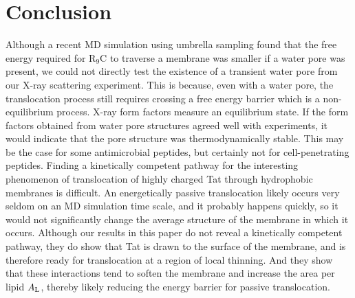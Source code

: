 \section{Conclusion}\label{sec:conclusion}
Although a recent MD simulation using umbrella sampling \cite{Huang13} found 
that the free energy required for R$_9$C to traverse a membrane was smaller 
if a water pore was present, we could not directly test the existence of a 
transient water pore from our X-ray scattering experiment. 
This is because, even with a water pore, the translocation process still 
requires crossing a free energy barrier which is a non-equilibrium process. 
X-ray form factors measure an equilibrium state. If the form factors obtained 
from water pore structures agreed well with experiments, it would indicate 
that the pore structure was thermodynamically stable. This may be the case for 
some antimicrobial peptides, but certainly not for cell-penetrating peptides.
Finding a kinetically competent pathway for the interesting phenomenon of 
translocation of highly charged Tat through hydrophobic membranes is difficult. 
An energetically passive translocation likely occurs very seldom on an MD 
simulation time scale, and it probably happens quickly, so it would not 
significantly change the average structure of the membrane in which it occurs. 
Although our results in this paper do not reveal a kinetically competent 
pathway, they do show that Tat is drawn to the surface of the membrane, and is 
therefore ready for translocation at a region of local thinning. And they show 
that these interactions tend to soften the membrane and increase
the area per lipid $A_\textrm{L}$, thereby likely reducing the energy barrier for 
passive translocation.